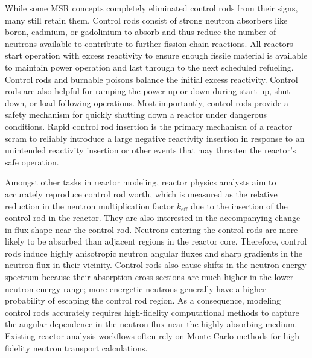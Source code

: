 While some \gls{MSR} concepts completely eliminated control rods from their signs, many still
retain them. Control rods consist of strong
neutron absorbers like boron, cadmium, or gadolinium to absorb and thus reduce the number of
neutrons available to contribute to further fission chain reactions. All reactors start operation
with excess reactivity to ensure enough fissile material is available to maintain power operation
and last through to the next scheduled refueling. Control rods and burnable poisons balance the
initial excess reactivity. Control rods are also helpful
for ramping the power up or down during start-up, shut-down, or load-following operations. Most
importantly, control rods provide a safety mechanism for quickly shutting down a reactor under
dangerous conditions. Rapid control rod insertion is the primary mechanism of a reactor scram to
reliably introduce a large negative reactivity insertion in response to an unintended reactivity
insertion or other events that may threaten the reactor's safe operation. 

Amongst other tasks in reactor modeling, reactor physics analysts aim to accurately reproduce
control rod worth, which is measured as the relative reduction
in the neutron multiplication factor $k_\text{eff}$ due to the insertion of the control rod in the
reactor. They are also interested in the accompanying change in flux shape near the
control rod. Neutrons entering the control rods are more likely to be absorbed than
adjacent regions in the reactor core. Therefore, control rods induce highly anisotropic neutron
angular fluxes and sharp gradients in the neutron flux in their vicinity. Control rods also cause
shifts in the neutron energy spectrum because their absorption cross sections are much higher in
the lower neutron energy range; more energetic neutrons generally have a higher probability of
escaping the control rod region. As a consequence, modeling control rods accurately requires
high-fidelity computational methods to capture the angular dependence in the neutron
flux near the highly absorbing medium. Existing reactor analysis workflows often rely on Monte
Carlo methods for high-fidelity neutron transport calculations.

